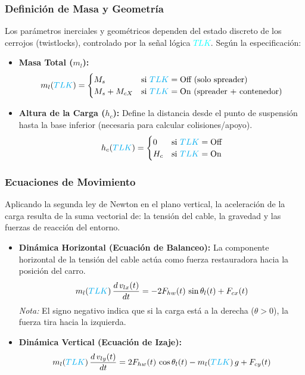 \documentclass[11pt]{article}                                    %
\begin{document}
\subsubsection*{Definición de Masa y Geometría}
Los parámetros inerciales y geométricos dependen del estado discreto de los cerrojos (twistlocks), controlado por la señal lógica \textcolor{cyan}{$TLK$}. Según la especificación:
\begin{itemize}
    \item \textbf{Masa Total ($m_l$):}
    \begin{equation}
        m_l(\textcolor{cyan}{TLK}) = 
        \begin{cases} 
            M_s & \text{si } \textcolor{cyan}{TLK} = \text{Off (solo spreader)} \\
            M_s + M_{cX} & \text{si } \textcolor{cyan}{TLK} = \text{On (spreader + contenedor)}
        \end{cases}
    \end{equation}

    \item \textbf{Altura de la Carga ($h_c$):} Define la distancia desde el punto de suspensión hasta la base inferior (necesaria para calcular colisiones/apoyo).
    \begin{equation}
        h_c(\textcolor{cyan}{TLK}) = 
        \begin{cases} 
            0 & \text{si } \textcolor{cyan}{TLK} = \text{Off} \\
            H_c & \text{si } \textcolor{cyan}{TLK} = \text{On}
        \end{cases}
    \end{equation}
\end{itemize}

\subsubsection*{Ecuaciones de Movimiento}
Aplicando la segunda ley de Newton en el plano vertical, la aceleración de la carga resulta de la suma vectorial de: la tensión del cable, la gravedad y las fuerzas de reacción del entorno.
\begin{itemize}
    \item \textbf{Dinámica Horizontal (Ecuación de Balanceo):} La componente horizontal de la tensión del cable actúa como fuerza restauradora hacia la posición del carro.
    \begin{equation} \label{eq:carga_horiz}
        m_l(\textcolor{cyan}{TLK}) \, \frac{d \, v_{lx}(t)}{dt} = -2 F_{hw}(t) \, \sin\theta_l(t) + F_{cx}(t)
    \end{equation}
    \textit{Nota:} El signo negativo indica que si la carga está a la derecha ($\theta > 0$), la fuerza tira hacia la izquierda.

    \item \textbf{Dinámica Vertical (Ecuación de Izaje):}
    \begin{equation} \label{eq:carga_vert}
        m_l(\textcolor{cyan}{TLK}) \, \frac{d \, v_{ly}(t)}{dt} = 2 F_{hw}(t) \, \cos\theta_l(t) - m_l(\textcolor{cyan}{TLK}) \, g + F_{cy}(t)
    \end{equation}
\end{itemize}
\end{document}
